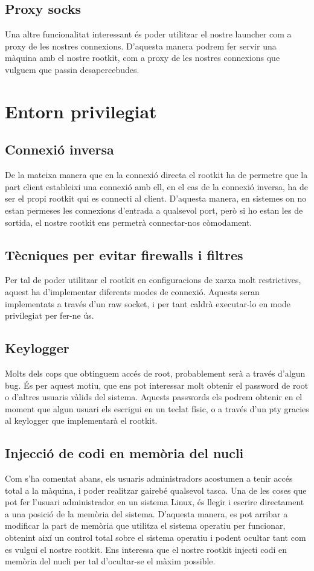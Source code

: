 \subsection{Proxy socks}
Una altre funcionalitat interessant és poder utilitzar el nostre launcher com a proxy de les nostres connexions. D'aquesta manera
podrem fer servir una màquina amb el nostre rootkit, com a proxy de les nostres connexions que vulguem que passin desapercebudes.

\section{Entorn privilegiat}

\subsection{Connexió inversa}
De la mateixa manera que en la connexió directa el rootkit ha de permetre que la part client estableixi una connexió amb ell, en el cas de la connexió inversa, ha de ser el propi rootkit qui es connecti al client. D'aquesta manera, en sistemes on no estan permeses les connexions d'entrada a qualsevol port, però si ho estan les de sortida, el nostre rootkit ens permetrà connectar-nos còmodament.

\subsection{Tècniques per evitar firewalls i filtres}
Per tal de poder utilitzar el rootkit en configuracions de xarxa molt restrictives, aquest ha d'implementar diferents modes de connexió.
Aquests seran implementats a través d'un raw socket, i per tant caldrà executar-lo en mode privilegiat per fer-ne ús.

\subsection{Keylogger}
Molts dels cops que obtinguem accés de root, probablement serà a través d'algun bug. És per aquest motiu, que ens pot interessar molt
obtenir el password de root o d'altres usuaris vàlids del sistema. Aquests passwords els podrem obtenir en el moment que algun usuari
els escrigui en un teclat físic, o a través d'un pty gracies al keylogger que implementarà el rootkit.

\subsection{Injecció de codi en memòria del nucli}
Com s'ha comentat abans, els usuaris administradors acostumen a tenir accés total a la màquina, i poder realitzar gairebé qualsevol tasca.
Una de les coses que pot fer l'usuari administrador en un sistema Linux, és llegir i escrire directament a una posició de la
memòria del sistema. D'aquesta manera, es pot arribar a modificar la part de memòria que utilitza el sistema operatiu per funcionar,
obtenint així un control total sobre el sistema operatiu i podent ocultar tant com es vulgui el nostre rootkit.
Ens interessa que el nostre rootkit injecti codi en memòria del nucli per tal d'ocultar-se el màxim possible.





